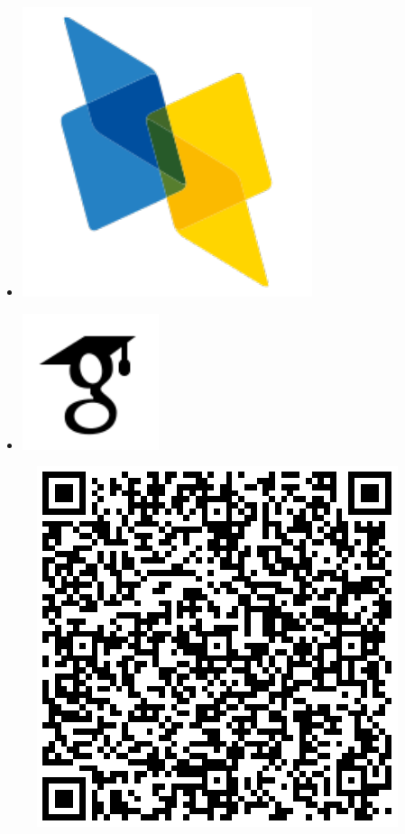 \documentclass[a4paper,oneside,11pt]{article}
\begin{document}
\begin{multicols}{9}
\begin{itemize}
\item[]\href{https://dblp.uni-trier.de/pers/hd/a/Angelidis:Iosif}{\includegraphics[scale=0.15]{assets/dblp.pdf}}

\item[]\href{https://scholar.google.gr/citations?user=r8jJLocAAAAJ&hl=en}{\includegraphics[scale=0.3]{assets/icons8-google-scholar.pdf}}

\end{itemize}
\end{multicols}

\vspace{30mm}

\begin{figure}[hbt!]
	\centering
	\includegraphics[scale=0.5]{qrcode.png}%
\end{figure}
\end{document}
